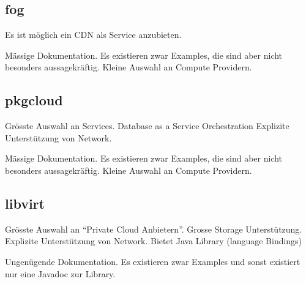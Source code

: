\subsection{fog}
\begin{Argumentation}
\pro Es ist möglich ein CDN als Service anzubieten.

\contra Mässige Dokumentation. Es existieren zwar 
Examples, die sind aber nicht besonders aussagekräftig.
\contra Kleine Auswahl an Compute Providern.
\end{Argumentation}

\subsection{pkgcloud}
\begin{Argumentation}
\pro Grösste Auswahl an Services.
\pro Database as a Service
\pro Orchestration
\pro Explizite Unterstützung von Network.

\contra Mässige Dokumentation. Es existieren zwar Examples, die sind aber nicht besonders aussagekräftig.
\contra Kleine Auswahl an Compute Providern.
\end{Argumentation}

\subsection{libvirt}
\begin{Argumentation}
\pro Grösste Auswahl an ``Private Cloud Anbietern''.
\pro Grosse Storage Unterstützung.
\pro Explizite Unterstützung von Network.
\pro Bietet Java Library (language Bindings)

\contra Ungenügende Dokumentation. Es existieren zwar Examples und 
sonst existiert nur eine Javadoc zur Library.
\end{Argumentation}









